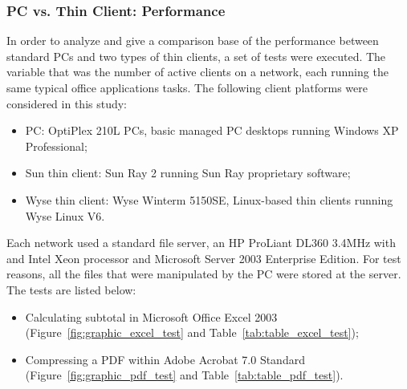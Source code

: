             \subsubsection*{PC vs. Thin Client: Performance}
                In order to analyze and give a comparison base of the performance between standard PCs and two types of thin clients, a set of tests were executed. The variable that was the number of active clients on a network, each running the same typical office applications tasks. The following client platforms were considered in this study:
                \begin{itemize}
                    \item PC: OptiPlex 210L PCs, basic managed PC desktops running Windows XP Professional;
                    \item Sun thin client: Sun Ray 2 running Sun Ray proprietary software;
                    \item Wyse thin client: Wyse Winterm 5150SE, Linux-based thin clients running Wyse Linux V6.
                \end{itemize}
                Each network used a standard file server, an HP ProLiant DL360 3.4MHz with and Intel Xeon processor and Microsoft Server 2003 Enterprise Edition. For test reasons, all the files that were manipulated by the PC were stored at the server. The tests are listed below:
                \begin{itemize}
                    \item Calculating subtotal in Microsoft Office Excel 2003 (Figure~\ref{fig:graphic_excel_test} and Table~\ref{tab:table_excel_test});
                    \item Compressing a PDF within Adobe Acrobat 7.0 Standard (Figure~\ref{fig:graphic_pdf_test} and Table~\ref{tab:table_pdf_test}).
                \end{itemize}
                
